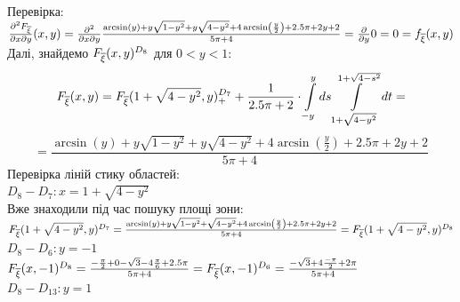 \documentclass[14pt,a4paper]{scrartcl}
\theoremstyle{definition}
\theoremstyle{remark}
\theoremstyle{definition}
\theoremstyle{definition}
\begin{document}
Перевірка:\\
$\frac{\partial^2 F_{\overline{\xi}}}{\partial x \partial y}(x,y) =
\frac{\partial^2}{\partial x \partial y} \frac{\arcsin\left(y\right)+y\sqrt{1-y^2}+  y  \sqrt{4-y^2}+4\arcsin\left(\frac{y}{2}\right) + 2.5\pi + 2y + 2}{5\pi + 4}  = \frac{\partial}{\partial y}0 = 0=f_{\overline{\xi}} (x,y)$\\
Далі, знайдемо $F_{\overline{\xi}}(x,y)^{D_8}$ для $ 0< y < 1$:
$$
F_{\overline{\xi}} (x,y) =  F_{\overline{\xi}} (1+\sqrt{4 - y^2}, y)^{D_7}_{+} + \frac{1}{2.5\pi + 2} \cdot  \int\limits_{-y}^{ y}{ds  \int\limits_{1 + \sqrt{4 - y^2}}^{1 + \sqrt{4 -  s^2}}{dt}} =
$$
$$
= \dfrac{\arcsin\left(y\right)+y\sqrt{1-y^2} +  y \sqrt{4-y^2}+4\arcsin\left(\frac{  y }{2}\right) + 2.5\pi + 2y + 2}{5\pi + 4}
$$
Перевірка ліній стику областей:\\
$D_8 - D_7: x = 1 + \sqrt{4 - y^2}$\\
Вже знаходили під час пошуку площі зони:\\
$ F_{\overline{\xi}} (1 + \sqrt{4 - y^2},y)^{D_7} =  \frac{\arcsin\left(y\right)+y\sqrt{1-y^2}+ \sqrt{4-y^2}+4\arcsin\left(\frac{y}{2}\right) + 2.5\pi + 2y + 2}{5\pi + 4} = F_{\overline{\xi}} (1 + \sqrt{4 - y^2},y)^{D_8}$\\
$D_8 - D_6: y = -1$\\
$ F_{\overline{\xi}} (x,-1)^{D_8} = \frac{- \frac{\pi}{2} +0-\sqrt{3}-4\frac{\pi}{6}  + 2.5\pi}{5\pi + 4}
 = F_{\overline{\xi}} (x,-1)^{D_6}  =  \frac{-\sqrt{3} + 4\frac{-\pi}{2}  + 2\pi }{5\pi +4}$\\
 $D_8 - D_13: y = 1$\\


\newpage
\end{document}
